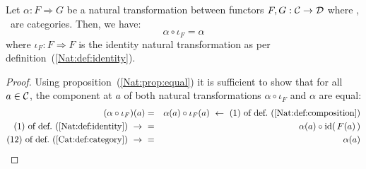\begin{prop}\label{Nat:prop:right:identity}
    Let $\alpha:F\Rightarrow G$ be a natural transformation between 
    functors $F,G:\mbox{$\cal C$}\to\mbox{$\cal D$}$ where \Cat, \Dat\ are categories. Then, we have:
        \[
            \alpha\circ\iota_{F} = \alpha
        \]
    where $\iota_{F}:F\Rightarrow F$ is the identity natural transformation
    as per definition~(\ref{Nat:def:identity}).
\end{prop}
\begin{proof}
    Using proposition~(\ref{Nat:prop:equal}) it is sufficient to show that for 
    all $a\in\mbox{$\cal C$}$, the component at $a$ of both natural transformations
    $\alpha\circ\iota_{F}$ and $\alpha$ are equal:
    \begin{eqnarray*} (\alpha\circ\iota_{F})(a)
        &=&\alpha(a)\circ\iota_{F}(a)
        \ \leftarrow\ \mbox{$(1)$ of def.~(\ref{Nat:def:composition})}\\
        \mbox{$(1)$ of def.~(\ref{Nat:def:identity})}\ \to\ 
        &=&\alpha(a)\circ\id(\,F(a)\,)\\
        \mbox{$(12)$ of def.~(\ref{Cat:def:category})}\ \to\ 
        &=&\alpha(a)
    \end{eqnarray*}
\end{proof}
